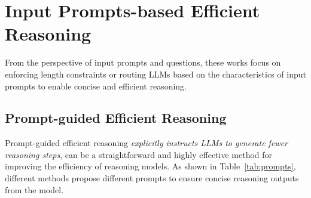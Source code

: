 \section{Input Prompts-based Efficient Reasoning}
From the perspective of input prompts and questions, these works focus on enforcing length constraints or routing LLMs based on the characteristics of input prompts to enable concise and efficient reasoning.

\subsection{Prompt-guided Efficient Reasoning}
\label{sec:prompts}

Prompt-guided efficient reasoning \textit{explicitly instructs LLMs to generate fewer reasoning steps}, can be a straightforward and highly effective method for improving the efficiency of reasoning models. As shown in Table~\ref{tab:prompts}, different methods propose different prompts to ensure concise reasoning outputs from the model.



